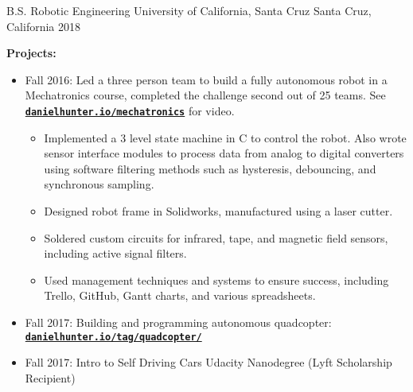 \begin{cventries}
  \cventry
    {B.S. Robotic Engineering}
    {University of California, Santa Cruz}
    {Santa Cruz, California}
    {2018}
    {
\textbf{Projects:}
\begin{itemize}
\item Fall 2016: Led a three person team to build a fully autonomous robot in a Mechatronics course, completed the challenge second out of 25 teams. See \textbf{\texttt{\href{https://danielhunter.io/mechatronics/}{danielhunter.io/mechatronics}}} for video.
  \begin{itemize}
      \item Implemented a 3 level state machine in C to control the robot. Also wrote sensor interface modules to process data from analog to digital converters using software filtering methods such as hysteresis, debouncing, and synchronous sampling. 
    \item Designed robot frame in Solidworks, manufactured using a laser cutter.
    \item Soldered custom circuits for infrared, tape, and magnetic field sensors, including active signal filters.
    \item Used management techniques and systems to ensure success, including Trello, GitHub, Gantt charts, and various spreadsheets.
    \end{itemize}
\item Fall 2017: Building and programming autonomous quadcopter: \textbf{\texttt{\href{https://danielhunter.io/tag/quadcopter/}{danielhunter.io/tag/quadcopter/}}}
\item Fall 2017: Intro to Self Driving Cars Udacity Nanodegree (Lyft Scholarship Recipient)
\end{itemize}
    }
\end{cventries}
